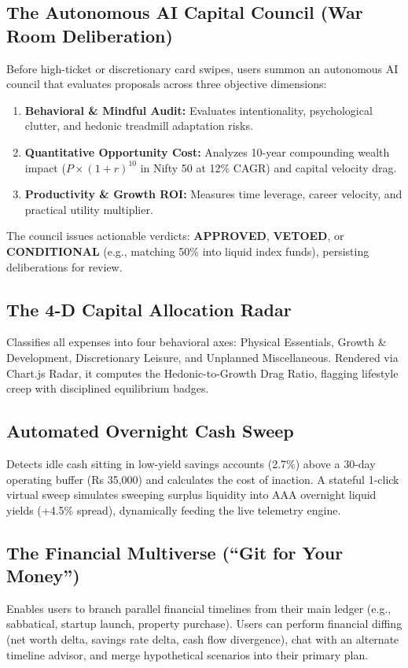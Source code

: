 \documentclass[12pt,a4paper]{report}
\begin{document}
\subsection{The Autonomous AI Capital Council (War Room Deliberation)}\label{s438}
Before high-ticket or discretionary card swipes, users summon an autonomous AI council that evaluates proposals across three objective dimensions:
\begin{enumerate}[leftmargin=*]
    \item \textbf{Behavioral \& Mindful Audit:} Evaluates intentionality, psychological clutter, and hedonic treadmill adaptation risks.
    \item \textbf{Quantitative Opportunity Cost:} Analyzes 10-year compounding wealth impact ($P \times (1+r)^{10}$ in Nifty 50 at 12\% CAGR) and capital velocity drag.
    \item \textbf{Productivity \& Growth ROI:} Measures time leverage, career velocity, and practical utility multiplier.
\end{enumerate}
The council issues actionable verdicts: \textbf{APPROVED}, \textbf{VETOED}, or \textbf{CONDITIONAL} (e.g., matching 50\% into liquid index funds), persisting deliberations for review.

\subsection{The 4-D Capital Allocation Radar}\label{s439}
Classifies all expenses into four behavioral axes: Physical Essentials, Growth \& Development, Discretionary Leisure, and Unplanned Miscellaneous. Rendered via Chart.js Radar, it computes the Hedonic-to-Growth Drag Ratio, flagging lifestyle creep with disciplined equilibrium badges.

\subsection{Automated Overnight Cash Sweep}\label{s4310}
Detects idle cash sitting in low-yield savings accounts (2.7\%) above a 30-day operating buffer (Rs 35,000) and calculates the cost of inaction. A stateful 1-click virtual sweep simulates sweeping surplus liquidity into AAA overnight liquid yields (+4.5\% spread), dynamically feeding the live telemetry engine.

\subsection{The Financial Multiverse (``Git for Your Money'')}\label{s4311}
Enables users to branch parallel financial timelines from their main ledger (e.g., sabbatical, startup launch, property purchase). Users can perform financial diffing (net worth delta, savings rate delta, cash flow divergence), chat with an alternate timeline advisor, and merge hypothetical scenarios into their primary plan.
\end{document}
